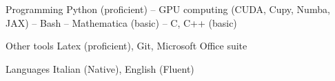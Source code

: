 


\begin{cvskills}


\cvskill
{Programming} %
{Python (proficient) -- GPU computing (CUDA, Cupy, Numba, JAX) -- Bash -- Mathematica (basic) -- C, C++ (basic)} %


\cvskill
{Other tools} %
{Latex (proficient), Git, Microsoft Office suite} %


\cvskill
{Languages} %
{Italian (Native), English (Fluent)} %


\end{cvskills}